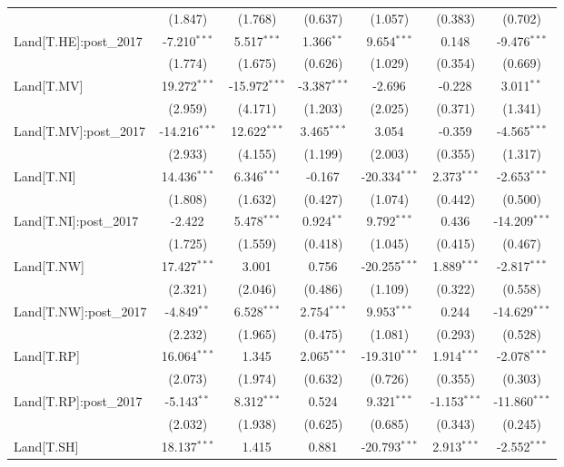 \begin{table}[!htbp]
\begin{tabular}{@{\extracolsep{5pt}}lcccccc}
  & (1.847) & (1.768) & (0.637) & (1.057) & (0.383) & (0.702) \\
 Land[T.HE]:post_2017 & -7.210$^{***}$ & 5.517$^{***}$ & 1.366$^{**}$ & 9.654$^{***}$ & 0.148$^{}$ & -9.476$^{***}$ \\
  & (1.774) & (1.675) & (0.626) & (1.029) & (0.354) & (0.669) \\
 Land[T.MV] & 19.272$^{***}$ & -15.972$^{***}$ & -3.387$^{***}$ & -2.696$^{}$ & -0.228$^{}$ & 3.011$^{**}$ \\
  & (2.959) & (4.171) & (1.203) & (2.025) & (0.371) & (1.341) \\
 Land[T.MV]:post_2017 & -14.216$^{***}$ & 12.622$^{***}$ & 3.465$^{***}$ & 3.054$^{}$ & -0.359$^{}$ & -4.565$^{***}$ \\
  & (2.933) & (4.155) & (1.199) & (2.003) & (0.355) & (1.317) \\
 Land[T.NI] & 14.436$^{***}$ & 6.346$^{***}$ & -0.167$^{}$ & -20.334$^{***}$ & 2.373$^{***}$ & -2.653$^{***}$ \\
  & (1.808) & (1.632) & (0.427) & (1.074) & (0.442) & (0.500) \\
 Land[T.NI]:post_2017 & -2.422$^{}$ & 5.478$^{***}$ & 0.924$^{**}$ & 9.792$^{***}$ & 0.436$^{}$ & -14.209$^{***}$ \\
  & (1.725) & (1.559) & (0.418) & (1.045) & (0.415) & (0.467) \\
 Land[T.NW] & 17.427$^{***}$ & 3.001$^{}$ & 0.756$^{}$ & -20.255$^{***}$ & 1.889$^{***}$ & -2.817$^{***}$ \\
  & (2.321) & (2.046) & (0.486) & (1.109) & (0.322) & (0.558) \\
 Land[T.NW]:post_2017 & -4.849$^{**}$ & 6.528$^{***}$ & 2.754$^{***}$ & 9.953$^{***}$ & 0.244$^{}$ & -14.629$^{***}$ \\
  & (2.232) & (1.965) & (0.475) & (1.081) & (0.293) & (0.528) \\
 Land[T.RP] & 16.064$^{***}$ & 1.345$^{}$ & 2.065$^{***}$ & -19.310$^{***}$ & 1.914$^{***}$ & -2.078$^{***}$ \\
  & (2.073) & (1.974) & (0.632) & (0.726) & (0.355) & (0.303) \\
 Land[T.RP]:post_2017 & -5.143$^{**}$ & 8.312$^{***}$ & 0.524$^{}$ & 9.321$^{***}$ & -1.153$^{***}$ & -11.860$^{***}$ \\
  & (2.032) & (1.938) & (0.625) & (0.685) & (0.343) & (0.245) \\
 Land[T.SH] & 18.137$^{***}$ & 1.415$^{}$ & 0.881$^{}$ & -20.793$^{***}$ & 2.913$^{***}$ & -2.552$^{***}$ \\

\end{tabular}
\end{table}
